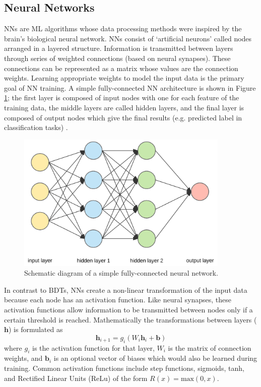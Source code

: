 \subsection{Neural Networks}
NNs are ML algorithms whose data processing methods were inspired by the brain's biological neural network. NNs consist of `artificial neurons' called nodes arranged in a layered structure. Information is transmitted between layers through series of weighted connections (based on neural synapses). These connections can be represented as a matrix whose values are the connection weights. Learning appropriate weights to model the input data is the primary goal of NN training. A simple fully-connected NN architecture is shown in Figure \ref{fig:nn_diag}; the first layer is composed of input nodes with one for each feature of the training data, the middle layers are called hidden layers, and the final layer is composed of output nodes which give the final results (e.g. predicted label in classification tasks) \cite{nn_paper}.\\

\begin{figure}[htb!]
    \centering
    \includegraphics[width=4in]{figures/chapter4/nn_diag.png}
    \caption{Schematic diagram of a simple fully-connected neural network.}
    \label{fig:nn_diag}
\end{figure}

In contrast to BDTs, NNs create a non-linear transformation of the input data because each node has an activation function. Like neural synapses, these activation functions allow information to be transmitted between nodes only if a certain threshold is reached. Mathematically the transformations between layers ($\mathbf{h}$) is formulated as
$$
\mathbf{h}_{i+1}=g_i(W_i\mathbf{h}_i+\mathbf{b})
$$
\noindent where $g_i$ is the activation function for that layer, $W_i$ is the matrix of connection weights, and $\mathbf{b}_i$ is an optional vector of biases which would also be learned during training. Common activation functions include step functions, sigmoids, tanh, and Rectified Linear Units (ReLu) of the form $R(x)=\text{max}(0,x)$.\\

